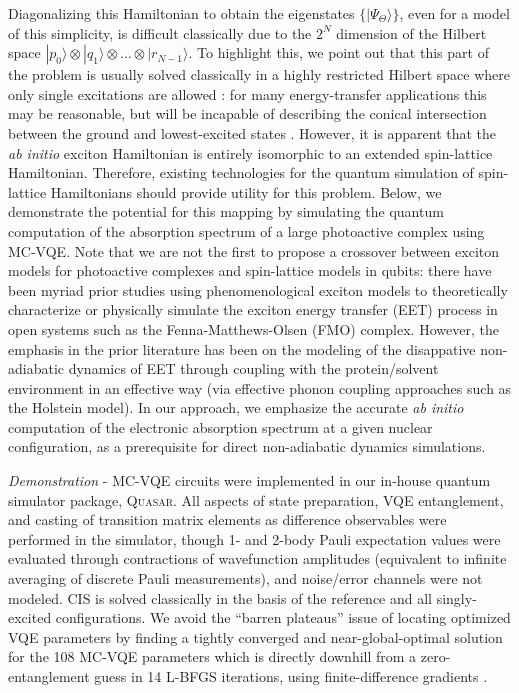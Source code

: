 \documentclass[aps,prl,twocolumn,showpacs,superscriptaddress,groupedaddress]{revtex4}  %
\begin{document}
Diagonalizing this Hamiltonian to obtain the eigenstates $\{ | \Psi_{\Theta}
\rangle \}$, even for a model of this simplicity, is difficult
classically due to the $2^N$ dimension of the Hilbert space $
|p_{0}\rangle
\otimes
|q_{1}\rangle
\otimes
\ldots
\otimes
|r_{N-1}\rangle$.
To highlight this, we point out that this part of the problem is usually solved
classically in a highly restricted Hilbert space where only single excitations
are allowed \cite{
Sisto:2014:2857,
Sisto:2017:14924,
Li:2017:3493}:
for many energy-transfer applications this may be reasonable, but will be
incapable of describing the conical intersection between the ground and
lowest-excited states \cite{Levine:2006:1039}. However, it is apparent that the
\emph{ab initio} exciton Hamiltonian is entirely isomorphic to an extended
spin-lattice Hamiltonian. Therefore, existing technologies for the quantum
simulation of spin-lattice Hamiltonians should provide utility for this problem.
Below, we demonstrate the potential for this mapping by simulating the quantum
computation of the absorption spectrum of a large photoactive complex using
MC-VQE. Note that we are not the first to propose a crossover between exciton
models for photoactive complexes and spin-lattice models in qubits: there have
been myriad prior studies using phenomenological exciton models to theoretically
characterize \cite{
Plenio:2008:113019,
Caruso:2009:09B612,
Caruso:2010:062346}
or physically simulate \cite{
Mostame:2012:105013,
Mostame:2017:44,
Potovcknik:2018:904,
Wang:2018}
the exciton energy transfer (EET) process in open systems such as the
Fenna-Matthews-Olsen (FMO) complex. However, the emphasis in the prior
literature has been on the modeling of the disappative non-adiabatic dynamics of
EET through coupling with the protein/solvent environment in an effective way
(via effective phonon coupling approaches such as the Holstein model). In our
approach, we emphasize the accurate \emph{ab initio} computation of the
electronic absorption spectrum at a given nuclear configuration, as a
prerequisite for direct non-adiabatic dynamics simulations.

\textit{Demonstration} - MC-VQE circuits were implemented in our in-house quantum
simulator package, \textsc{Quasar}. All aspects of state preparation, VQE
entanglement, and casting of transition matrix elements as difference
observables were performed in the simulator, though 1- and 2-body Pauli
expectation values were evaluated through contractions of wavefunction
amplitudes (equivalent to infinite averaging of discrete Pauli measurements),
and noise/error channels were not modeled. CIS is solved classically in the
basis of the reference and all singly-excited configurations.  We avoid the
``barren plateaus'' issue of locating optimized VQE parameters
\cite{McClean:2018:X} by finding a tightly converged and near-global-optimal
solution for the 108 MC-VQE parameters which is directly downhill from a
zero-entanglement guess in 14 L-BFGS iterations, using finite-difference
gradients \cite{SuppNote}.
\end{document}
